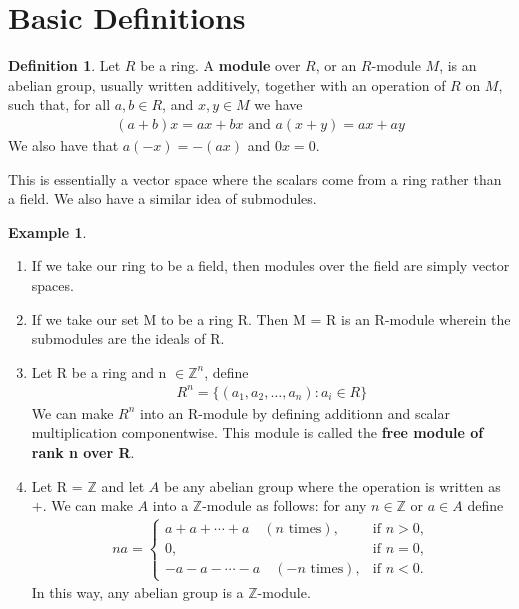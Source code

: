 \documentclass[12pt]{book}
\theoremstyle{definition}
\newtheorem{definition}[theorem]{Definition}
\newtheorem{example}[theorem]{Example}
\begin{document}
\section{Basic Definitions}
\begin{definition}
    Let $R$ be a ring. A \textbf{module} over $R$, or an $R$-module $M$, is an abelian group, usually written additively, together with an operation of $R$ on $M$, such that, for all $a, b \in R$, and $x, y \in M$ we have 
    \begin{align*}
        (a + b)x = ax + bx \text{ and } a(x + y) = ax + ay
    \end{align*}
    We also have that $a(-x) = -(ax)$ and $0x = 0$. 
\end{definition}
This is essentially a vector space where the scalars come from a ring rather than a field. We also have a similar idea of submodules. 

\begin{example}
    \begin{enumerate}
        \item If we take our ring to be a field, then modules over the field are simply vector spaces.
        \item If we take our set M to be a ring R. Then M = R is an R-module wherein the submodules are the ideals of R. 
        \item  Let R be a ring and n $\in \mathbb{Z}^n$, define 
        \begin{align*}
            R^n = \{(a_1, a_2, \dots, a_n) : a_i \in R\}
        \end{align*}
        We can make $R^n$ into an R-module by defining additionn and scalar multiplication componentwise. This module is called the \textbf{free module of rank n over R}.
        \item Let R = $\mathbb{Z}$ and let $A$ be any abelian group where the operation is written as $+$. We can make $A$ into a $\mathbb{Z}$-module as follows: for any $n \in \mathbb{Z}$ or $a \in A$ define
        \begin{align*}
            na = 
            \begin{cases}
            a + a + \cdots + a \quad (n \text{ times}), & \text{if } n > 0, \\
            0, & \text{if } n = 0, \\
            - a - a - \cdots - a \quad (-n \text{ times}), & \text{if } n < 0.
            \end{cases}                
        \end{align*}
        In this way, any abelian group is a $\mathbb{Z}$-module. 
    \end{enumerate}
\end{example}
\end{document}
